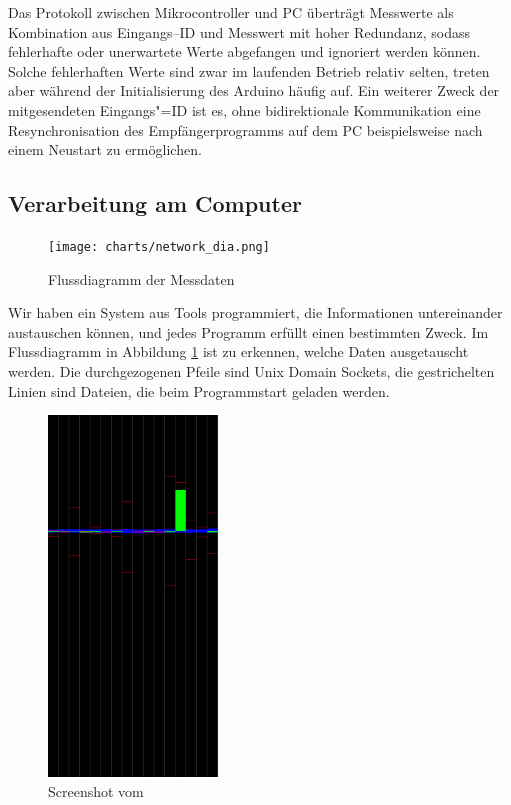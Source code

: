 Das Protokoll zwischen Mikrocontroller und PC überträgt Messwerte als Kombination aus
Eingangs--ID und Messwert mit hoher Redundanz, sodass fehlerhafte oder
unerwartete Werte abgefangen und
ignoriert werden können. Solche fehlerhaften Werte sind zwar im laufenden Betrieb relativ selten,
treten aber während der Initialisierung des Arduino häufig auf. Ein weiterer Zweck der
mitgesendeten Eingangs"=ID ist es, ohne bidirektionale Kommunikation eine Resynchronisation des
Empfängerprogramms auf dem PC beispielsweise nach einem Neustart zu ermöglichen.

\subsection{Verarbeitung am Computer}

\begin{figure}
  \texttt{[image: charts/network\_dia.png]}
  \caption{Flussdiagramm der Messdaten}
  \label{fig:network}
\end{figure}

Wir haben ein System aus Tools programmiert, die Informationen untereinander austauschen können, und jedes Programm erfüllt einen bestimmten Zweck.
Im Flussdiagramm in Abbildung \ref{fig:network} ist zu erkennen, welche Daten ausgetauscht werden.
Die durchgezogenen Pfeile sind Unix Domain Sockets, die gestrichelten Linien sind Dateien, die beim Programmstart geladen werden.

\begin{figure}
  \includegraphics[width=0.4\textwidth]{images/rangetester.png}
  \caption{Screenshot vom }
  \label{fig:screenrangetester}
\end{figure}


